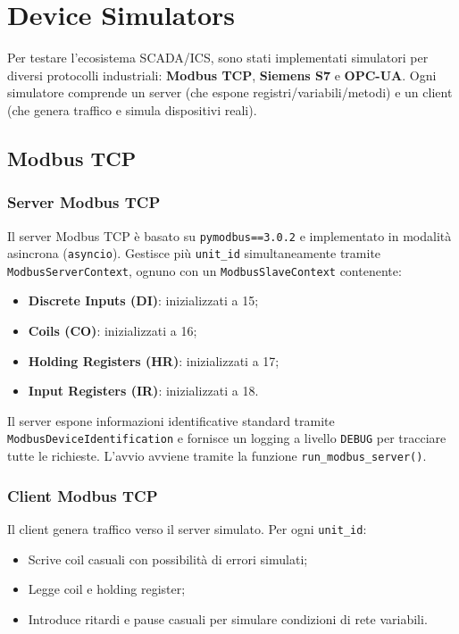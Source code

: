 \section{Device Simulators}

Per testare l’ecosistema SCADA/ICS, sono stati implementati simulatori per diversi protocolli industriali: \textbf{Modbus TCP}, \textbf{Siemens S7} e \textbf{OPC-UA}.  
Ogni simulatore comprende un server (che espone registri/variabili/metodi) e un client (che genera traffico e simula dispositivi reali).

\subsection{Modbus TCP}

\subsubsection{Server Modbus TCP}

Il server Modbus TCP è basato su \texttt{pymodbus==3.0.2} e implementato in modalità asincrona (\texttt{asyncio}).  
Gestisce più \texttt{unit\_id} simultaneamente tramite \texttt{ModbusServerContext}, ognuno con un \texttt{ModbusSlaveContext} contenente:

\begin{itemize}
    \item \textbf{Discrete Inputs (DI)}: inizializzati a 15;
    \item \textbf{Coils (CO)}: inizializzati a 16;
    \item \textbf{Holding Registers (HR)}: inizializzati a 17;
    \item \textbf{Input Registers (IR)}: inizializzati a 18.
\end{itemize}

Il server espone informazioni identificative standard tramite \texttt{ModbusDeviceIdentification} e fornisce un logging a livello \texttt{DEBUG} per tracciare tutte le richieste.  
L’avvio avviene tramite la funzione \texttt{run\_modbus\_server()}.

\subsubsection{Client Modbus TCP}

Il client genera traffico verso il server simulato. Per ogni \texttt{unit\_id}:

\begin{itemize}
    \item Scrive coil casuali con possibilità di errori simulati;
    \item Legge coil e holding register;
    \item Introduce ritardi e pause casuali per simulare condizioni di rete variabili.
\end{itemize}

